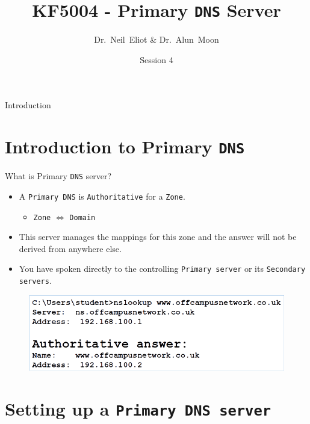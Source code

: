 \documentclass[xcolor=table]{beamer}
\title{KF5004 - Primary \texttt{DNS} Server}
\author{Dr.~Neil~Eliot \& Dr.~Alun~Moon}
\institute[Northumbria University] %
{
  Department of Computer and Information Sciences\\
  University of Northumbria
}
\date{Session 4}
\begin{document}
\begin{frame}
  \titlepage
\end{frame}

\begin{frame}{Introduction}
  \tableofcontents
\end{frame}


\section{Introduction to Primary \texttt{DNS}}
\begin{frame}{What is Primary \texttt{DNS} server?}
  \begin{itemize}
    \item A \texttt{Primary DNS} is \texttt{Authoritative} for a \texttt{Zone}.
      \begin{itemize}
          \item \texttt{Zone} $\Longleftrightarrow$ \texttt{Domain}
      \end{itemize}
    \item This server manages the mappings for this zone and the answer will not be derived from anywhere else.
    \item You have spoken directly to the controlling \texttt{Primary server} or its \texttt{Secondary servers}.
  \end{itemize}
  \begin{figure}
    \begin{center}
      \includegraphics[width=0.8\linewidth]{Authoritative.png}
    \end{center}
  \end{figure}
\end{frame}

\section{Setting up a \texttt{Primary DNS server}}
\end{document}
